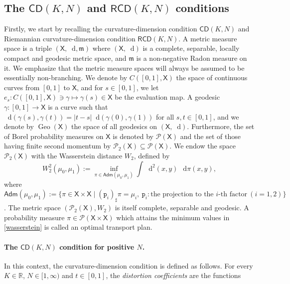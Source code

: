 \documentclass[11pt,twoside,a4paper]{article}
\newcommand*\diff{\mathop{}\!\mathrm{d}}
\newcommand{\R}{\mathbb{R}}
\newcommand{\p}{\mathtt p}
\newcommand{\prob}{\mathscr P}
\newcommand{\cd}{\mathsf{CD}}
\newcommand{\RCD}{\mathsf{RCD}}
\newcommand{\X}{\mathsf{X}}
\newcommand{\m}{\mathfrak m} %
\DeclareMathOperator{\Geo}{Geo}
\newcommand{\Prob}{\mathscr{P}}
\theoremstyle{theorem}
\theoremstyle{definition}
\theoremstyle{remark}
\theoremstyle{proof}
\begin{document}
\subsection{The \texorpdfstring{$\cd(K,N)$}{CD(K, N)} and \texorpdfstring{$\RCD(K,N)$}{RCD(K, N)}  conditions}
Firstly,
we start by recalling the curvature-dimension condition $\cd(K,N)$ and Riemannian curvature-dimension condition $\RCD(K,N)$.
A metric measure space is a triple $(\X,\diff,\m)$ where $(\X,\diff)$ is a complete, separable, locally compact and geodesic metric space, and $\m$ is a non-negative Radon measure on it.
We emphasize that the metric measure spaces will always be assumed to be essentially non-branching.
We denote by $C([0, 1], \X)$ the space of continuous curves from $[0, 1]$ to $\X$, and for $s \in [0, 1]$, we let $e_s : C([0, 1], \X)\ni \gamma\mapsto \gamma(s) \in \X$ be the evaluation map.
A geodesic $\gamma:[0,1]\to \X$ is a curve such that $\diff(\gamma(s), \gamma(t)) = |t - s| \diff(\gamma(0), \gamma(1))$ for all $s, t \in [0, 1]$, and we denote by $\Geo(\X)$ the space of all geodesics on $(\X,\diff)$.
Furthermore, the set of Borel probability measures on $\X$ is denoted by $\Prob(\X)$ and the set of those having finite second momentum by $\Prob_2(\X) \subseteq \Prob(\X)$. We endow the space $\Prob_2(\X)$ with the Wasserstein distance $W_2$, defined by
\begin{equation}\label{wasserstein}
W_2^2(\mu_0, \mu_1) := \inf_{\pi \in \mathsf{Adm}(\mu_0,\mu_1)}  \int \diff^2(x, y) \, \diff \pi(x, y),
\end{equation}
where $\mathsf{Adm}(\mu_0, \mu_1):=\{\pi\in \X\times \X\mid (\p_i)_\sharp \pi = \mu_i,\ \p_i : \text{the projection to the $i$-th factor}~(i=1,2)\}$.
The metric space $(\Prob_2(\X),W_2)$ is itself complete, separable and geodesic.
A probability measure $\pi\in \prob(\X\times \X)$ which attains the minimum values in \cref{wasserstein} is called an optimal transport plan.


\paragraph{The \texorpdfstring{$\cd(K,N)$}{CD(K, N)} condition for positive \texorpdfstring{$N$}{N}.}
In this context, the curvature-dimension condition is defined as follows.
For every $K \in \R$, $N\in [1,\infty)$ and $t\in [0,1]$, the \emph{distortion coefficients} are the functions
\end{document}
